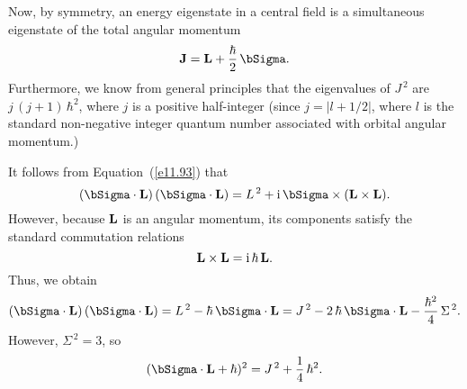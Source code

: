 Now, by symmetry, an energy eigenstate in a central field is a simultaneous eigenstate of the total angular momentum
\begin{equation}
{\bf J} = {\bf L} + \frac{\hbar}{2}\,\bSigma.
\end{equation}
Furthermore, we know from general principles that the eigenvalues of $J^{\,2}$ are $j\,(j+1)\,\hbar^2$, where $j$ is a positive half-integer (since
$j=|l+1/2|$, where $l$ is the standard non-negative integer quantum number associated with orbital angular momentum.)

It follows from Equation~(\ref{e11.93}) that
\begin{equation}
(\bSigma\cdot {\bf L})\,(\bSigma\cdot{\bf L}) = L^{\,2} + {\rm i}\,\bSigma\times ({\bf L}\times {\bf L}).
\end{equation}
However, because ${\bf L}$ is an angular momentum, its components satisfy the standard commutation relations
\begin{equation}
{\bf L}\times {\bf L} = {\rm i}\,\hbar\,{\bf L}.
\end{equation}
Thus, we obtain
\begin{equation}
(\bSigma\cdot {\bf L})\,(\bSigma\cdot{\bf L}) = L^{\,2} -\hbar\,\bSigma\cdot{\bf L} = J^{\,2} - 2\,\hbar\,\bSigma\cdot{\bf L} -\frac{\hbar^2}{4}\,\Sigma^{\,2}.
\end{equation}
However, $\Sigma^{\,2}=3$, so
\begin{equation}\label{e11.128}
(\bSigma\cdot {\bf L} + \hbar)^2 = J^{\,2}+\frac{1}{4}\,\hbar^2.
\end{equation}

